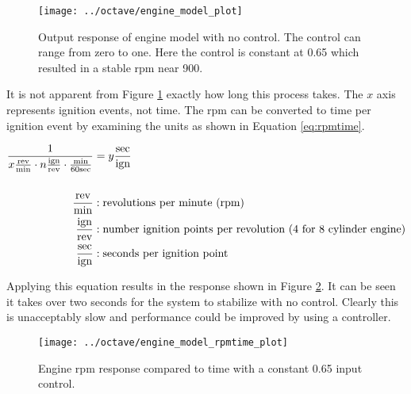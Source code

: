 \documentclass{article}
\begin{document}
\begin{figure}[htbp!]
\begin{center}
\texttt{[image: ../octave/engine\_model\_plot]}
\end{center}
\caption{Output response of engine model with no control.
The control can range from zero to one.
Here the control is constant at 0.65 which resulted in a stable
rpm near 900.\protect\footnotemark}
\label{fig:em_plot}
\end{figure}

It is not apparent from Figure \ref{fig:em_plot} exactly how long
this process takes.
The $x$ axis represents ignition events, not time.
The rpm can be converted to time per ignition event by examining
the units as shown in Equation \ref{eq:rpmtime}.

\begin{align}
\frac{1}{x \frac{\text{rev}}{\text{min}}
			\cdot n \frac{\text{ign}}{\text{rev}}
			\cdot \frac{\text{min}}{60\text{sec}}
		}
&= y \frac{\text{sec}}{\text{ign}} \label{eq:rpmtime} \\
& \notag \\
	\frac{\text{rev}}{\text{min}} &: \text{revolutions per minute (rpm)} \notag \\
	\frac{\text{ign}}{\text{rev}} &: \text{number ignition points per revolution (4 for 8 cylinder engine)} \notag \\
	\frac{\text{sec}}{\text{ign}} &: \text{seconds per ignition point} \notag
\end{align}

Applying this equation results in the response shown
in Figure \ref{fig:rpmtime_plot}.
It can be seen it takes over two seconds for the system to
stabilize with no control.
Clearly this is unacceptably slow and performance could be
improved by using a controller.

\begin{figure}[htbp!]
\begin{center}
\texttt{[image: ../octave/engine\_model\_rpmtime\_plot]}
\end{center}
\caption{Engine rpm response compared to time with a constant
0.65 input control.\protect\footnotemark}
\label{fig:rpmtime_plot}
\end{figure}
\end{document}
